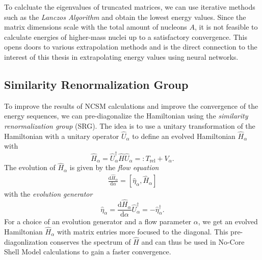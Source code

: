 To calcluate the eigenvalues of truncated matrices, we can use iterative methods such as the \textit{Lanczos Algorithm} and obtain the lowest energy values. Since the matrix dimensions scale with the total amount of nucleons $A$, it is not feasible to calculate energies of higher-mass nuclei up to a satisfactory convergence. This opens doors to various extrapolation methods and is the direct connection to the interest of this thesis in extrapolating energy values using neural networks.

\subsection{Similarity Renormalization Group}
To improve the results of NCSM calculations and improve the convergence of the energy sequences, we can pre-diagonalize the Hamiltonian using the \textit{similarity renormalization group} (SRG). The idea is to use a unitary transformation of the Hamiltonian with a unitary operator $\hat{U}_\alpha$ to define an evolved Hamiltonian $\hat{H}_\alpha$ with
\begin{equation}
  \hat{H}_\alpha = \hat{U}_\alpha^\dagger \hat{H} \hat{U}_\alpha =: T_\mathrm{rel} + V_\alpha.
\end{equation}
The evolution of $\hat{H}_\alpha$ is given by the \textit{flow equation}
\begin{align}
  \frac{\mathrm{d}\hat{H}_\alpha}{\mathrm{d}\alpha} = [\hat{\eta}_\alpha, \hat{H}_\alpha]
\end{align}
with the \textit{evolution generator}
\begin{equation}
  \hat{\eta}_\alpha = \frac{\mathrm{d}\hat{H}_\alpha}{\mathrm{d}\alpha} \hat{U}^\dagger_\alpha = -\hat{\eta}_\alpha^\dagger.
\end{equation}
For a choice of an evolution generator and a flow parameter $\alpha$, we get an evolved Hamiltonian $\hat{H}_\alpha$ with matrix entries more focused to the diagonal. This pre-diagonlization conserves the spectrum of $\hat{H}$ and can thus be used in No-Core Shell Model calculations to gain a faster convergence.
